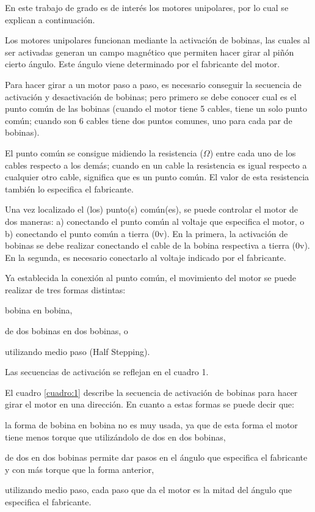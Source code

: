 	 En este trabajo de grado es de interés los motores unipolares, por lo cual se 
	explican a continuación. 
	
	 Los motores unipolares funcionan mediante la activación de bobinas, las 
	cuales al ser activadas generan un campo magnético que permiten hacer girar al piñón 
	cierto ángulo. Este ángulo viene determinado por el fabricante del motor. 
	
	 Para hacer girar a un motor paso a paso, es necesario conseguir la secuencia 
	de activación y desactivación de bobinas; pero primero se debe conocer cual es el 
	punto común de las bobinas (cuando el motor tiene 5 cables, tiene un solo punto 
	común; cuando son 6 cables tiene dos puntos comunes, uno para cada par de 
	bobinas).  
	
	 El punto común se consigue midiendo la resistencia ($\Omega$) entre cada uno de los 
	cables respecto a los demás; cuando en un cable la resistencia es igual respecto a 
	cualquier otro cable, significa que es un punto común. El valor de esta resistencia 
	también lo especifica el fabricante. 

	 Una vez localizado el (los) punto(s) común(es), se puede controlar el motor de 
	dos maneras: a) conectando el punto común al voltaje que especifica el motor, o b) 
	conectando el punto común a tierra (0v). En la primera, la activación de bobinas se 
	debe realizar conectando el cable de la bobina respectiva a tierra (0v). En la segunda, 
	es necesario conectarlo al voltaje indicado por el fabricante. 
	
	 Ya establecida la conexión al punto común, el movimiento del motor se puede 
	realizar de tres formas distintas:
	\begin{enumeracionenparrafo}
		\item bobina en bobina, 
		\item de dos bobinas en dos bobinas, o 
		\item utilizando medio paso (Half Stepping).
		\end{enumeracionenparrafo}
		
	Las secuencias de activación se reflejan en el cuadro 1. 
	
	 El cuadro \ref{cuadro:1} describe la secuencia de activación de bobinas para hacer girar el 
	motor en una dirección. En cuanto a estas formas se puede decir que:
	\begin{enumeracionenparrafo}
		\item la forma de 
	bobina en bobina no es muy usada, ya que de esta forma el motor tiene menos torque 
	que utilizándolo de dos en dos bobinas, 
	\item de dos en dos bobinas permite dar pasos en 
	el ángulo que especifica el fabricante y con más torque que la forma anterior,
	\item 
	utilizando medio paso, cada paso que da el motor es la mitad del ángulo que 
	especifica el fabricante. 
	\end{enumeracionenparrafo}
	
